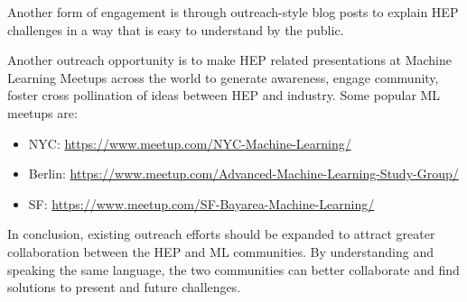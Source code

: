 Another form of engagement is through outreach-style blog posts to explain HEP challenges in a way that is easy to understand by the public.

Another outreach opportunity is to make HEP related presentations at Machine Learning Meetups across the world to generate awareness, engage community, foster cross pollination of ideas between HEP and industry. Some popular ML meetups are:
\begin{itemize}
 \item NYC: \url{https://www.meetup.com/NYC-Machine-Learning/}
 \item Berlin: \url{https://www.meetup.com/Advanced-Machine-Learning-Study-Group/}
 \item SF: \url{https://www.meetup.com/SF-Bayarea-Machine-Learning/}
\end{itemize}

In conclusion, existing outreach efforts should be expanded to attract greater collaboration between the HEP and ML communities. By understanding and speaking the same language, the two communities can better collaborate and find solutions to present and future challenges.

